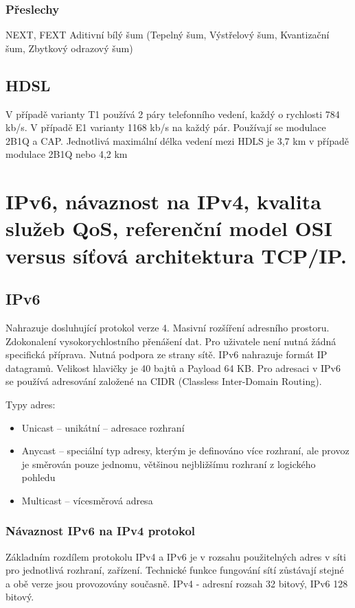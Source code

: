 \subsubsection{Přeslechy}
NEXT, FEXT
Aditivní bílý šum (Tepelný šum, Výstřelový šum, Kvantizační šum, Zbytkový odrazový šum)

\subsection{HDSL}
V případě varianty T1 používá 2 páry telefonního vedení, každý o rychlosti 784 kb/s. V případě E1 varianty 1168 kb/s na každý pár. Používají se modulace 2B1Q a CAP. Jednotlivá maximální délka vedení mezi HDLS je 3,7 km v případě modulace 2B1Q nebo 4,2 km

\newpage
\section{IPv6, návaznost na IPv4, kvalita služeb QoS, referenční model OSI versus síťová architektura TCP/IP.}

\subsection{IPv6}
Nahrazuje dosluhující protokol verze 4. Masivní rozšíření adresního prostoru. Zdokonalení vysokorychlostního přenášení dat. Pro uživatele není nutná žádná specifická příprava. Nutná podpora ze strany sítě. IPv6 nahrazuje formát IP datagramů. Velikost hlavičky je 40 bajtů a Payload 64 KB. Pro adresaci v IPv6 se používá adresování založené na CIDR (Classless Inter-Domain Routing). 

Typy adres:
\begin{itemize}
    \item Unicast – unikátní – adresace rozhraní
    \item Anycast – speciální typ adresy, kterým je definováno více rozhraní, ale provoz je směrován pouze jednomu, většinou nejbližšímu rozhraní z logického pohledu
    \item Multicast – vícesměrová adresa
\end{itemize}

\subsubsection{Návaznost IPv6 na IPv4 protokol}
Základním rozdílem protokolu IPv4 a IPv6 je v rozsahu použitelných adres v síti pro jednotlivá rozhraní, zařízení. Technické funkce fungování sítí zůstávají stejné a obě verze jsou provozovány současně. IPv4 - adresní rozsah 32 bitový, IPv6 128 bitový.

